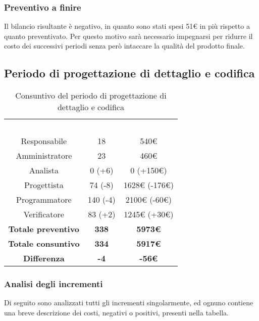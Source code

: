 \subsubsection{Preventivo a finire}
Il bilancio risultante è negativo, in quanto sono stati spesi 51€ in più rispetto a quanto preventivato. Per questo motivo sarà necessario impegnarsi per ridurre il costo dei successivi periodi senza però intaccare la qualità del prodotto finale.

\subsection{Periodo di progettazione di dettaglio e codifica}
\label{tab:pb}
\begin{table}[H]
\centering\renewcommand{\arraystretch}{1.5}
\caption{Consuntivo del periodo di progettazione di dettaglio e codifica}
\vspace{0.2cm}
\begin{tabular}{ c c c }
\rowcolor{redafk}
\textcolor{white}{\textbf{Ruolo}} & \textcolor{white}{\textbf{Ore}} &
\textcolor{white}{\textbf{Costo}}  \\
Responsabile 	& 18 & 540€ \\
Amministratore 	&  23	& 460€ \\
Analista 		& 0 (+6)  & 0 (+150€) \\
Progettista		&  74 (-8) & 1628€ (-176€)\\
Programmatore	&  	140 (-4)& 2100€ (-60€)\\
Verificatore 	& 83 (+2) &  1245€ (+30€)\\
\textbf{Totale preventivo} & \textbf{338} & \textbf{5973€}  \\
\textbf{Totale consuntivo} & \textbf{334} & \textbf{5917€} \\
\rowcolor{lastrowcolor}
\textbf{Differenza} & \textbf{-4} & \textbf{-56€} \\
\end{tabular}
\end{table}

\subsubsection{Analisi degli incrementi}
Di seguito sono analizzati tutti gli incrementi singolarmente, ed ognuno contiene una breve descrizione dei costi, negativi o positivi, presenti nella tabella.

